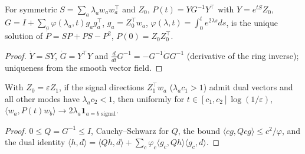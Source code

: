 \begin{lemma}\label{lem:riccati_closed_form}
\leanok
For symmetric $S=\sum_a\lambda_aw_aw_a^\top$ and $Z_0$, $P(t)=Y G^{-1}Y^\top$ with $Y=e^{tS}Z_0$,
$G=I+\sum_a\varphi(\lambda_a,t)g_ag_a^\top$, $g_a=Z_0^\top w_a$, $\varphi(\lambda,t)=\int_0^te^{2\lambda s}ds$,
is the unique solution of $\dot P=SP+PS-P^2$, $P(0)=Z_0Z_0^\top$.
\end{lemma}
\begin{proof}
\leanok
$\dot Y=SY$, $\dot G=Y^\top Y$ and $\tfrac{d}{dt}G^{-1}=-G^{-1}\dot GG^{-1}$ (derivative of the ring
inverse); uniqueness from the smooth vector field.
\end{proof}

\begin{lemma}\label{lem:riccati_window}
\leanok
With $Z_0=\varepsilon Z_1$, if the signal directions $Z_1^\top w_a$ ($\lambda_ac_1>1$) admit dual
vectors and all other modes have $\lambda_ac_2<1$, then uniformly for
$t\in[c_1,c_2]\log(1/\varepsilon)$, $\langle w_a,P(t)w_b\rangle\to2\lambda_a\mathbf 1_{a=b\text{ signal}}$.
\end{lemma}
\begin{proof}
\leanok
$0\le Q=G^{-1}\le I$, Cauchy--Schwarz for $Q$, the bound $\langle cg,Qcg\rangle\le c^2/\varphi$, and
the dual identity $\langle h,d\rangle=\langle Qh,d\rangle+\sum_c\varphi_c\langle g_c,Qh\rangle\langle g_c,d\rangle$.
\end{proof}


